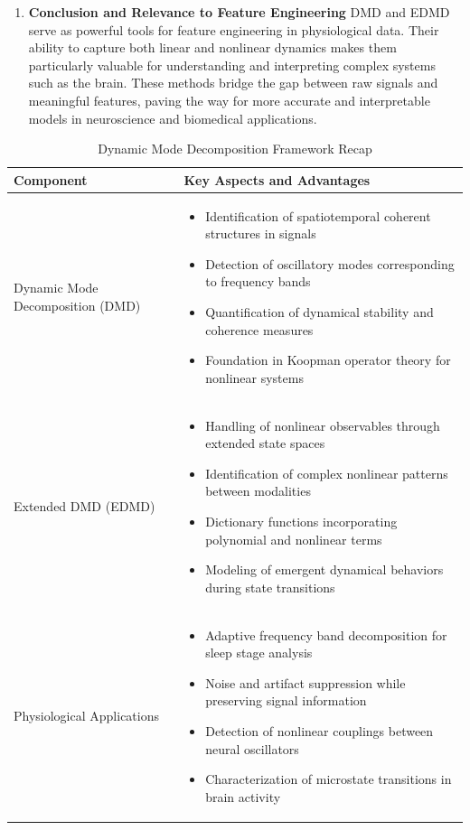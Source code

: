 \documentclass[a4paper,12pt,twoside]{article}
\begin{document}
\begin{enumerate}
\item \textbf{Conclusion and Relevance to Feature Engineering}
DMD and EDMD serve as powerful tools for feature engineering in physiological data. Their ability to capture both linear and nonlinear dynamics makes them particularly valuable for understanding and interpreting complex systems such as the brain. These methods bridge the gap between raw signals and meaningful features, paving the way for more accurate and interpretable models in neuroscience and biomedical applications.
\end{enumerate}

\begin{table}[H]
\centering
\caption{Dynamic Mode Decomposition Framework Recap}
\begin{tabular}{|p{3cm}|p{11cm}|}
\hline
\textbf{Component} & \textbf{Key Aspects and Advantages} \\
\hline
Dynamic Mode Decomposition (DMD) & 
\begin{itemize}
  \item Identification of spatiotemporal coherent structures in signals
  \item Detection of oscillatory modes corresponding to frequency bands
  \item Quantification of dynamical stability and coherence measures
  \item Foundation in Koopman operator theory for nonlinear systems
\end{itemize} \\
\hline
Extended DMD (EDMD) & 
\begin{itemize}
  \item Handling of nonlinear observables through extended state spaces
  \item Identification of complex nonlinear patterns between modalities
  \item Dictionary functions incorporating polynomial and nonlinear terms
  \item Modeling of emergent dynamical behaviors during state transitions
\end{itemize} \\
\hline
Physiological Applications & 
\begin{itemize}
  \item Adaptive frequency band decomposition for sleep stage analysis
  \item Noise and artifact suppression while preserving signal information
  \item Detection of nonlinear couplings between neural oscillators
  \item Characterization of microstate transitions in brain activity
\end{itemize} \\
\hline
\end{tabular}
\label{tab:dmd_framework_summary}
\end{table}
\end{document}
